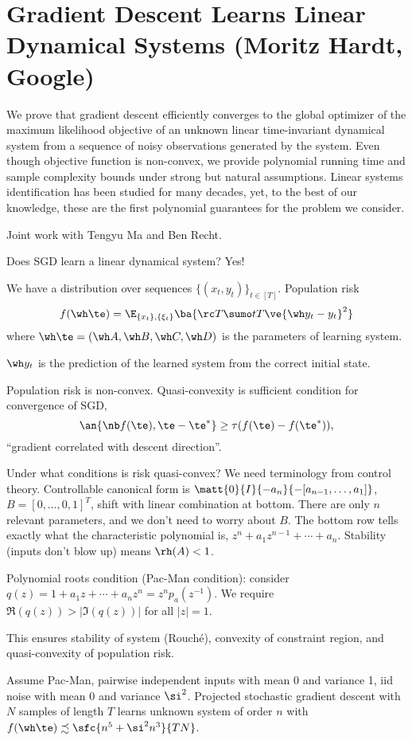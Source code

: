 \section{Gradient Descent Learns Linear Dynamical Systems (Moritz Hardt, Google)}

We prove that gradient descent efficiently converges to the global optimizer of the maximum likelihood objective of an unknown linear time-invariant dynamical system from a sequence of noisy observations generated by the system. Even though objective function is non-convex, we provide polynomial running time and sample complexity bounds under strong but natural assumptions. Linear systems identification has been studied for many decades, yet, to the best of our knowledge, these are the first polynomial guarantees for the problem we consider.
 
Joint work with Tengyu Ma and Ben Recht.

Does SGD learn a linear dynamical system? Yes!

We have a distribution over sequences $\{(x_t,y_t)\}_{t\in [T]}$. 
Population risk $$f(\wh \te )  =\E_{\{x_t\},\{\xi_t\}}\ba{\rc T \sumo tT \ve{\wh y_t-y_t}^2}$$
where $\wh \te = (\wh A, \wh B, \wh C, \wh D)$ is the parameters of learning system. 

$\wh y_t$ is the prediction of the  learned system from the correct initial state.

Population risk is non-convex. Quasi-convexity is sufficient condition for convergence of SGD,
$$
\an{\nb f(\te), \te - \te^*} \ge \tau(f(\te) - f(\te^*)),
$$
``gradient correlated with descent direction''. 

Under what conditions is risk quasi-convex?
We need terminology from control theory.
Controllable canonical form is $\matt{0}{I}{-a_n}{-[a_{n-1},\ldots ,a_1]}$, $B=[0,\ldots, 0,1]^T$, shift with linear combination at bottom. There are only $n$ relevant parameters, and we don't need to worry about $B$. The bottom row tells exactly what the characteristic polynomial is, $z^n+a_1z^{n-1}+\cdots + a_n$. 
Stability (inputs don't blow up) means $\rh(A)<1$. 

Polynomial roots condition (Pac-Man condition): consider $q(z) = 1+a_1z+\cdots + a_nz^n= z^n p_a(z^{-1})$. We require $\Re(q(z)) > |\Im (q(z))|$ for all $|z|=1$.

This ensures stability of system (Rouch\'e), convexity of constraint region, and quasi-convexity of population risk.

Assume Pac-Man, pairwise independent inputs with mean 0 and variance 1, iid noise with mean 0 and variance $\si^2$.  %
Projected stochastic gradient descent with $N$ samples of length $T$ learns unknown system of order $n$ with $f(\wh \te) \precsim \sfc{n^5+\si^2n^3}{TN}$.

